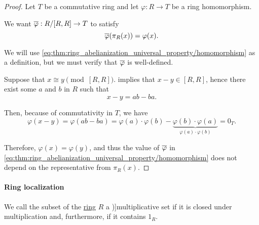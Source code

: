 \begin{proof}
  Let \( T \) be a commutative ring and let \( \varphi: R \to T \) be a ring homomorphism.

  We want \( \oline{\varphi}: R / [R, R] \to T \) to satisfy
  \begin{equation}\label{eq:thm:ring_abelianization_universal_property/homomorphism}
    \oline{\varphi}(\pi_R(x)) = \varphi(x).
  \end{equation}

  We will use \eqref{eq:thm:ring_abelianization_universal_property/homomorphism} as a definition, but we must verify that \( \oline{\varphi} \) is well-defined.

  Suppose that \( x \cong y \pmod {[R, R]} \).  implies that \( x - y \in [R, R] \), hence there exist some \( a \) and \( b \) in \( R \) such that
  \begin{equation*}
    x - y = ab - ba.
  \end{equation*}

  Then, because of commutativity in \( T \), we have
  \begin{equation*}
    \varphi(x - y)
    =
    \varphi(ab - ba)
    =
    \varphi(a) \cdot \varphi(b) - \underbrace{\varphi(b) \cdot \varphi(a)}_{\varphi(a) \cdot \varphi(b)}
    =
    0_T.
  \end{equation*}

  Therefore, \( \varphi(x) = \varphi(y) \), and thus the value of \( \oline{\varphi} \) in \eqref{eq:thm:ring_abelianization_universal_property/homomorphism} does not depend on the representative from \( \pi_R(x) \).
\end{proof}

\paragraph{Ring localization}

\begin{definition}\label{def:multiplicative_set_in_ring}
  We call the subset of the \hyperref[def:ring]{ring} \( R \) a \term[bg=мултипликативно затворено множество (\cite[23]{КоцевСидеров2016КомАлгебра})]{multiplicative set} if it is closed under multiplication and, furthermore, if it contains \( 1_R \).
\end{definition}


